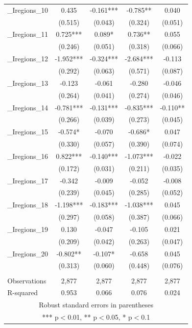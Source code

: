 \documentclass[]{article}
\begin{document}
\begin{tabular}{lcccc}
\_Iregions\_10 & 0.435 & -0.161*** & -0.785** & 0.040 \\
 & (0.515) & (0.043) & (0.324) & (0.051) \\
\_Iregions\_11 & 0.725*** & 0.089* & 0.736** & 0.055 \\
 & (0.246) & (0.051) & (0.318) & (0.066) \\
\_Iregions\_12 & -1.952*** & -0.324*** & -2.684*** & -0.113 \\
 & (0.292) & (0.063) & (0.571) & (0.087) \\
\_Iregions\_13 & -0.123 & -0.061 & -0.280 & -0.046 \\
 & (0.264) & (0.041) & (0.274) & (0.046) \\
\_Iregions\_14 & -0.781*** & -0.131*** & -0.835*** & -0.110** \\
 & (0.266) & (0.039) & (0.273) & (0.045) \\
\_Iregions\_15 & -0.574* & -0.070 & -0.686* & 0.047 \\
 & (0.330) & (0.057) & (0.390) & (0.074) \\
\_Iregions\_16 & 0.822*** & -0.140*** & -1.073*** & -0.022 \\
 & (0.172) & (0.031) & (0.211) & (0.035) \\
\_Iregions\_17 & -0.342 & -0.009 & -0.052 & -0.008 \\
 & (0.239) & (0.045) & (0.285) & (0.052) \\
\_Iregions\_18 & -1.198*** & -0.183*** & -1.038*** & 0.045 \\
 & (0.297) & (0.058) & (0.387) & (0.066) \\
\_Iregions\_19 & 0.130 & -0.047 & -0.105 & 0.021 \\
 & (0.209) & (0.042) & (0.263) & (0.047) \\
\_Iregions\_20 & -0.802** & -0.107* & -0.658 & 0.045 \\
 & (0.313) & (0.060) & (0.448) & (0.076) \\
 &  &  &  &  \\
Observations & 2,877 & 2,877 & 2,877 & 2,877 \\
 R-squared & 0.953 & 0.066 & 0.076 & 0.024 \\ \hline
\multicolumn{5}{c}{ Robust standard errors in parentheses} \\
\multicolumn{5}{c}{ *** p$<$0.01, ** p$<$0.05, * p$<$0.1} \\
\end{tabular}
\end{document}
